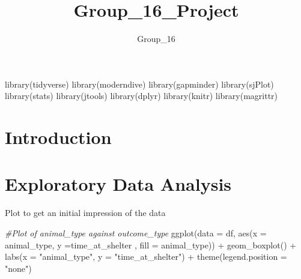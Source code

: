 \documentclass[
]{article}
\title{Group\_16\_Project}
\author{Group\_16}
\date{}
\newenvironment{Shaded}{\begin{snugshade}}{\end{snugshade}}
\newcommand{\AttributeTok}[1]{\textcolor[rgb]{0.77,0.63,0.00}{#1}}
\newcommand{\CommentTok}[1]{\textcolor[rgb]{0.56,0.35,0.01}{\textit{#1}}}
\newcommand{\FunctionTok}[1]{\textcolor[rgb]{0.00,0.00,0.00}{#1}}
\newcommand{\NormalTok}[1]{#1}
\newcommand{\OtherTok}[1]{\textcolor[rgb]{0.56,0.35,0.01}{#1}}
\newcommand{\SpecialCharTok}[1]{\textcolor[rgb]{0.00,0.00,0.00}{#1}}
\newcommand{\StringTok}[1]{\textcolor[rgb]{0.31,0.60,0.02}{#1}}
\begin{document}
\maketitle

\begin{Shaded}
\begin{Highlighting}[]
\FunctionTok{library}\NormalTok{(tidyverse)}
\FunctionTok{library}\NormalTok{(moderndive)}
\FunctionTok{library}\NormalTok{(gapminder)}
\FunctionTok{library}\NormalTok{(sjPlot)}
\FunctionTok{library}\NormalTok{(stats)}
\FunctionTok{library}\NormalTok{(jtools)}
\FunctionTok{library}\NormalTok{(dplyr)}
\FunctionTok{library}\NormalTok{(knitr)}
\FunctionTok{library}\NormalTok{(magrittr)}
\end{Highlighting}
\end{Shaded}

\hypertarget{sec:Intro}{%
\section{Introduction}\label{sec:Intro}}

\hypertarget{sec:EDA}{%
\section{Exploratory Data Analysis}\label{sec:EDA}}

\begin{Shaded}
\end{Shaded}

Plot to get an initial impression of the data

\begin{Shaded}
\begin{Highlighting}[]
\CommentTok{\#Plot of animal\_type against outcome\_type}
\FunctionTok{ggplot}\NormalTok{(}\AttributeTok{data =}\NormalTok{ df, }\FunctionTok{aes}\NormalTok{(}\AttributeTok{x =}\NormalTok{ animal\_type, }\AttributeTok{y =}\NormalTok{time\_at\_shelter , }\AttributeTok{fill =}\NormalTok{ animal\_type)) }\SpecialCharTok{+}
\FunctionTok{geom\_boxplot}\NormalTok{() }\SpecialCharTok{+}
\FunctionTok{labs}\NormalTok{(}\AttributeTok{x =} \StringTok{"animal\_type"}\NormalTok{, }\AttributeTok{y =} \StringTok{"time\_at\_shelter"}\NormalTok{) }\SpecialCharTok{+}
\FunctionTok{theme}\NormalTok{(}\AttributeTok{legend.position =} \StringTok{"none"}\NormalTok{)}
\end{Highlighting}
\end{Shaded}
\end{document}
